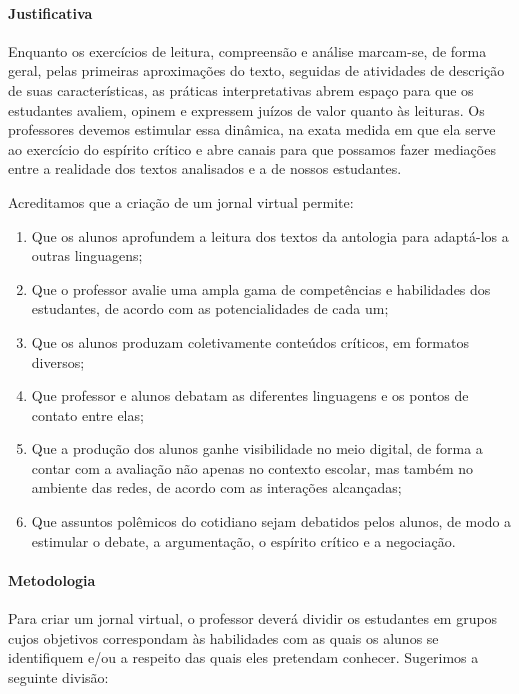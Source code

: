 \documentclass[12pt]{extarticle}
\begin{document}
\paragraph{Justificativa} Enquanto os exercícios de leitura, compreensão e
análise marcam-se, de forma geral, pelas primeiras aproximações do
texto, seguidas de atividades de descrição de suas características, as
práticas interpretativas abrem espaço para que os estudantes avaliem,
opinem e expressem juízos de valor quanto às leituras. Os professores
devemos estimular essa dinâmica, na exata medida em que ela serve ao
exercício do espírito crítico e abre canais para que possamos fazer
mediações entre a realidade dos textos analisados e a de nossos
estudantes.

Acreditamos que a criação de um jornal virtual permite:
\begin{enumerate}
\item
Que os alunos
aprofundem a leitura dos textos da antologia para adaptá-los a outras
linguagens; 
\item
Que o professor avalie uma ampla gama de competências e
habilidades dos estudantes, de acordo com as potencialidades de cada um;
\item
Que os alunos produzam coletivamente conteúdos críticos, em formatos
diversos; 
\item
Que professor e alunos debatam as diferentes linguagens e
os pontos de contato entre elas; 
\item
Que a produção dos alunos ganhe
visibilidade no meio digital, de forma a contar com a avaliação não
apenas no contexto escolar, mas também no ambiente das redes, de acordo
com as interações alcançadas; 
\item
Que assuntos polêmicos do cotidiano
sejam debatidos pelos alunos, de modo a estimular o debate, a
argumentação, o espírito crítico e a negociação.
\end{enumerate}

\paragraph{Metodologia}
Para criar um jornal virtual, o professor deverá dividir os estudantes
em grupos cujos objetivos correspondam às habilidades com as quais os
alunos se identifiquem e/ou a respeito das quais eles pretendam
conhecer. Sugerimos a seguinte divisão:
\end{document}
